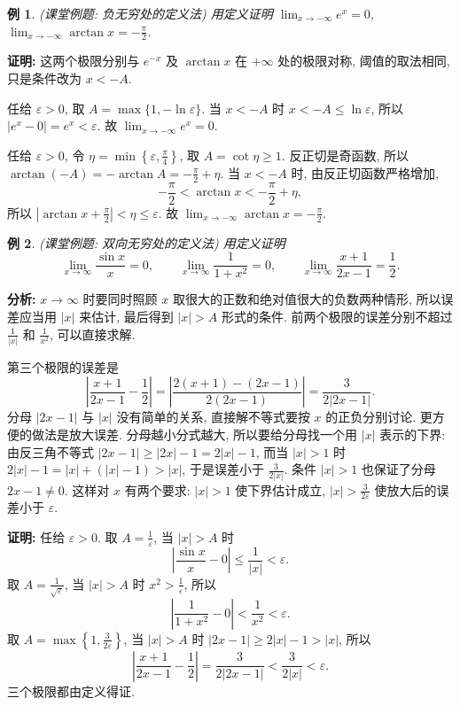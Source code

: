 \documentclass[UTF8,openany]{ctexbook}
\theoremstyle{chinesetextbook}
\newtheorem{example}{例}[section]
\newenvironment{cnproof}{\par\indent\textbf{证明:} \ignorespaces}{\par}
\begin{document}
\begin{example}
\textnormal{(课堂例题: 负无穷处的定义法)} 用定义证明 $\displaystyle\lim_{x\to-\infty}e^x=0$, $\displaystyle\lim_{x\to-\infty}\arctan x=-\frac\pi2$.
\end{example}
\begin{cnproof}
这两个极限分别与 $e^{-x}$ 及 $\arctan x$ 在 $+\infty$ 处的极限对称, 阈值的取法相同, 只是条件改为 $x<-A$.

任给 $\varepsilon>0$, 取 $A=\max\{1,-\ln\varepsilon\}$. 当 $x<-A$ 时 $x<-A\le\ln\varepsilon$, 所以 $|e^x-0|=e^x<\varepsilon$. 故 $\displaystyle\lim_{x\to-\infty}e^x=0$.

任给 $\varepsilon>0$, 令 $\displaystyle\eta=\min\left\{\varepsilon,\frac\pi4\right\}$, 取 $A=\cot\eta\ge1$. 反正切是奇函数, 所以 $\displaystyle\arctan(-A)=-\arctan A=-\frac\pi2+\eta$. 当 $x<-A$ 时, 由反正切函数严格增加,
\[
-\frac\pi2<\arctan x<-\frac\pi2+\eta,
\]
所以 $\displaystyle\left|\arctan x+\frac\pi2\right|<\eta\le\varepsilon$. 故 $\displaystyle\lim_{x\to-\infty}\arctan x=-\frac\pi2$.
\end{cnproof}
\begin{example}
\textnormal{(课堂例题: 双向无穷处的定义法)} 用定义证明
\[
\lim_{x\to\infty}\frac{\sin x}x=0,\qquad\lim_{x\to\infty}\frac1{1+x^2}=0,\qquad\lim_{x\to\infty}\frac{x+1}{2x-1}=\frac12.
\]
\end{example}
\par\indent\textbf{分析:} $x\to\infty$ 时要同时照顾 $x$ 取很大的正数和绝对值很大的负数两种情形, 所以误差应当用 $|x|$ 来估计, 最后得到 $|x|>A$ 形式的条件. 前两个极限的误差分别不超过 $\displaystyle\frac1{|x|}$ 和 $\displaystyle\frac1{x^2}$, 可以直接求解.

第三个极限的误差是
\[
\left|\frac{x+1}{2x-1}-\frac12\right|=\left|\frac{2(x+1)-(2x-1)}{2(2x-1)}\right|=\frac3{2|2x-1|}.
\]
分母 $|2x-1|$ 与 $|x|$ 没有简单的关系, 直接解不等式要按 $x$ 的正负分别讨论. 更方便的做法是放大误差. 分母越小分式越大, 所以要给分母找一个用 $|x|$ 表示的下界: 由反三角不等式 $|2x-1|\ge|2x|-1=2|x|-1$, 而当 $|x|>1$ 时 $2|x|-1=|x|+(|x|-1)>|x|$, 于是误差小于 $\displaystyle\frac3{2|x|}$. 条件 $|x|>1$ 也保证了分母 $2x-1\ne0$. 这样对 $x$ 有两个要求: $|x|>1$ 使下界估计成立, $\displaystyle|x|>\frac3{2\varepsilon}$ 使放大后的误差小于 $\varepsilon$.
\begin{cnproof}
任给 $\varepsilon>0$. 取 $\displaystyle A=\frac1\varepsilon$, 当 $|x|>A$ 时
\[
\left|\frac{\sin x}x-0\right|\le\frac1{|x|}<\varepsilon.
\]
取 $\displaystyle A=\frac1{\sqrt\varepsilon}$, 当 $|x|>A$ 时 $\displaystyle x^2>\frac1\varepsilon$, 所以
\[
\left|\frac1{1+x^2}-0\right|<\frac1{x^2}<\varepsilon.
\]
取 $\displaystyle A=\max\left\{1,\frac3{2\varepsilon}\right\}$, 当 $|x|>A$ 时 $|2x-1|\ge2|x|-1>|x|$, 所以
\[
\left|\frac{x+1}{2x-1}-\frac12\right|=\frac3{2|2x-1|}<\frac3{2|x|}<\varepsilon.
\]
三个极限都由定义得证.
\end{cnproof}
\end{document}
